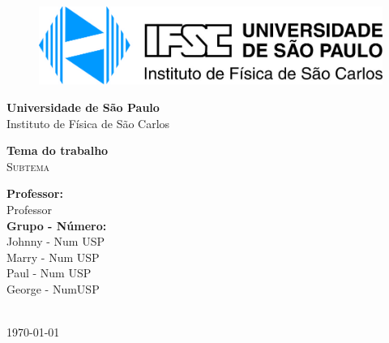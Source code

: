 \documentclass{article}
\newcommand{\thetitle}{Tema do trabalho}
\begin{document}
\begin{titlepage}
    \begin{center}
        \begin{figure}[htb!]
            \centering
            \includegraphics[width=150mm]{../images/ifsc_logo.jpg}
        \end{figure}
        \vspace{20pt}
        \LARGE{\textbf{Universidade de São Paulo}}\\
        \LARGE{Instituto de Física de São Carlos}\\

        \vspace{150pt}

        
        \LARGE{\textbf{{\thetitle}}} 
        \\ 
        \textsc{\LARGE Subtema}
        \\
        
        
        \vspace{125pt}
        \begin{minipage}{\textwidth}
            \begin{flushleft} \large
                \textbf{Professor:}\\
                Professor\\[0.8cm]
                \textbf{Grupo - Número:}\\
                Johnny - Num USP
                \\
                Marry - Num USP
                \\
                Paul - Num USP
                \\
                George - NumUSP
                
                \end{flushleft}
                \end{minipage}\\[1 cm]
        \vspace{30pt}
        \vspace{\fill}  
        \Large {\today}

    \end{center}
\end{titlepage}
\end{document}

